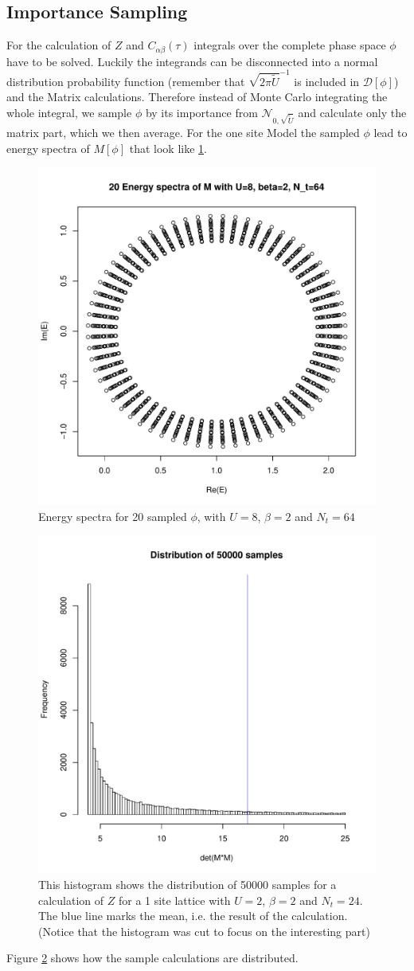\subsection{Importance Sampling}
For the calculation of $Z$ and $C_{\alpha\beta}(\tau)$ integrals over the complete phase space $\phi$ have to be solved. Luckily the integrands can be disconnected into a normal distribution probability function (remember that $\sqrt{2\pi\tilde{U}}^{-1}$ is included in $\mathcal{D}[\phi]$) and the Matrix calculations.
Therefore instead of Monte Carlo integrating the whole integral, we sample $\phi$ by its importance from $\mathcal{N}_{0, \sqrt{\tilde{U}}}$ and calculate only the matrix part, which we then average.
For the one site Model the sampled $\phi$ lead to energy spectra of $M[\phi]$ that look like \ref{fig:spectra}.
\begin{figure}[H]
	\centering
	\includegraphics[width=0.5\linewidth]{figs/spectra}
	\caption[Energy Spectra]{Energy spectra for 20 sampled $\phi$, with $U=8$, $\beta=2$ and $N_t=64$}
	\label{fig:spectra}
\end{figure}
\begin{figure}[H]
	\centering
	\includegraphics[width=0.5\linewidth]{figs/distribution}
	\caption[Distribution of 50000 samples]{This histogram shows the distribution of 50000 samples for a calculation of $Z$ for a 1 site lattice with $U=2$, $\beta=2$ and $N_t=24$. The blue line marks the mean, i.e. the result of the calculation. (Notice that the histogram was cut to focus on the interesting part)}
	\label{fig:distribution}
\end{figure}
Figure \ref{fig:distribution} shows how the sample calculations are distributed.